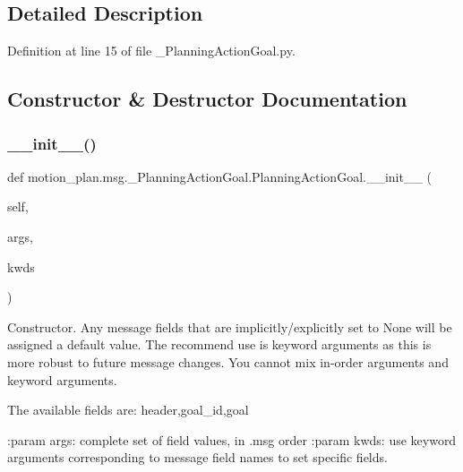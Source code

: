 \subsection{Detailed Description}


Definition at line 15 of file \+\_\+\+Planning\+Action\+Goal.\+py.



\subsection{Constructor \& Destructor Documentation}
\mbox{\label{classmotion__plan_1_1msg_1_1__PlanningActionGoal_1_1PlanningActionGoal_a1d197500f581452923df439580a1641e}} 
\subsubsection{\texorpdfstring{\+\_\+\+\_\+init\+\_\+\+\_\+()}{\_\_init\_\_()}}
{\footnotesize\ttfamily def motion\+\_\+plan.\+msg.\+\_\+\+Planning\+Action\+Goal.\+Planning\+Action\+Goal.\+\_\+\+\_\+init\+\_\+\+\_\+ (\begin{DoxyParamCaption}\item[{}]{self,  }\item[{}]{args,  }\item[{}]{kwds }\end{DoxyParamCaption})}

\begin{DoxyVerb}Constructor. Any message fields that are implicitly/explicitly
set to None will be assigned a default value. The recommend
use is keyword arguments as this is more robust to future message
changes.  You cannot mix in-order arguments and keyword arguments.

The available fields are:
   header,goal_id,goal

:param args: complete set of field values, in .msg order
:param kwds: use keyword arguments corresponding to message field names
to set specific fields.
\end{DoxyVerb}
 

